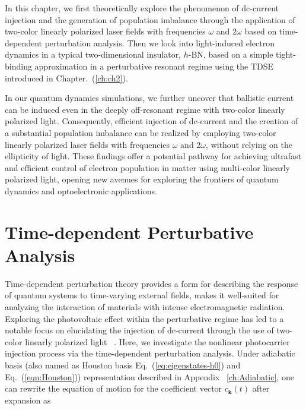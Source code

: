In this chapter, we first theoretically explore the phenomenon of dc-current injection and the
generation of population imbalance through the application of two-color linearly polarized laser
fields with frequencies $\omega$ and $2\omega$ based on time-dependent perturbation analysis.
Then we look into light-induced electron dynamics in a typical two-dimensional insulator, $h$-BN, based on a simple tight-binding approximation in a perturbative resonant regime using the \gls{TDSE} introduced in Chapter.~(\ref{ch:ch2}).

In our quantum dynamics simulations, we further uncover that ballistic current can be induced even
in the deeply off-resonant regime with two-color linearly polarized light.  Consequently, efficient
injection of dc-current and the creation of a substantial population imbalance can be realized by
employing two-color linearly polarized laser fields with frequencies $\omega$ and $2\omega$,
without relying on the ellipticity of light. These findings offer a potential pathway for achieving
ultrafast and efficient control of electron population in matter using multi-color linearly
polarized light, opening new avenues for exploring the frontiers of quantum dynamics and
optoelectronic applications. 

\section{Time-dependent Perturbative Analysis \label{sec:deriveperturbation}}
Time-dependent perturbation theory provides a form for describing the response of quantum systems to time-varying external fields, makes it well-suited for analyzing the interaction of materials with intense electromagnetic radiation. 
Exploring the photovoltaic effect within the perturbative regime has led to a notable focus on elucidating the injection of dc-current through the use of two-color linearly polarized light ~\cite{PhysRevLett.74.3596,PhysRevLett.76.1703,PhysRevLett.78.306,Sun2010,PhysRevB.100.075202,HeideBoolakeeEcksteinHommelhoff+2021+3701+3707,PhysRevLett.123.067402}. 
Here, we investigate the nonlinear photocarrier injection process via the time-dependent perturbation analysis.
Under adiabatic basis (also named as Houston basis Eq.~(\ref{eq:eigenstates-h0}) and Eq.~(\ref{eqn:Houston})) representation described in Appendix ~\ref{ch:Adiabatic}, one can rewrite the equation of motion for the coefficient vector $c_{\mathbf k} (t)$ after expansion as

